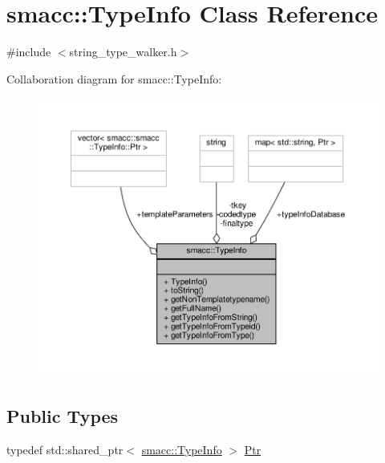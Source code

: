 \hypertarget{classsmacc_1_1TypeInfo}{}\section{smacc\+:\+:Type\+Info Class Reference}
\label{classsmacc_1_1TypeInfo}


{\ttfamily \#include $<$string\+\_\+type\+\_\+walker.\+h$>$}



Collaboration diagram for smacc\+:\+:Type\+Info\+:
\nopagebreak
\begin{figure}[H]
\begin{center}
\leavevmode
\includegraphics[width=350pt]{classsmacc_1_1TypeInfo__coll__graph}
\end{center}
\end{figure}
\subsection*{Public Types}
\begin{DoxyCompactItemize}
\item 
typedef std\+::shared\+\_\+ptr$<$ \hyperlink{classsmacc_1_1TypeInfo}{smacc\+::\+Type\+Info} $>$ \hyperlink{classsmacc_1_1TypeInfo_aca0cd51c7c9ef85f6c98dc32878af226}{Ptr}
\end{DoxyCompactItemize}
